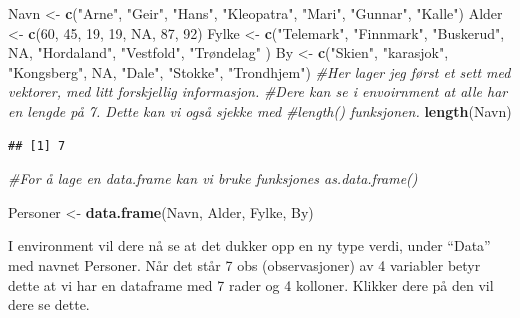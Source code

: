 \documentclass[
]{article}
\newenvironment{Shaded}{\begin{snugshade}}{\end{snugshade}}
\newcommand{\CommentTok}[1]{\textcolor[rgb]{0.56,0.35,0.01}{\textit{#1}}}
\newcommand{\DecValTok}[1]{\textcolor[rgb]{0.00,0.00,0.81}{#1}}
\newcommand{\KeywordTok}[1]{\textcolor[rgb]{0.13,0.29,0.53}{\textbf{#1}}}
\newcommand{\NormalTok}[1]{#1}
\newcommand{\OtherTok}[1]{\textcolor[rgb]{0.56,0.35,0.01}{#1}}
\newcommand{\StringTok}[1]{\textcolor[rgb]{0.31,0.60,0.02}{#1}}
\begin{document}
\begin{Shaded}
\begin{Highlighting}[]
\NormalTok{Navn <-}\StringTok{ }\KeywordTok{c}\NormalTok{(}\StringTok{"Arne"}\NormalTok{, }\StringTok{"Geir"}\NormalTok{, }\StringTok{"Hans"}\NormalTok{, }\StringTok{"Kleopatra"}\NormalTok{, }\StringTok{"Mari"}\NormalTok{, }\StringTok{"Gunnar"}\NormalTok{, }\StringTok{"Kalle"}\NormalTok{)}
\NormalTok{Alder <-}\StringTok{ }\KeywordTok{c}\NormalTok{(}\DecValTok{60}\NormalTok{, }\DecValTok{45}\NormalTok{, }\DecValTok{19}\NormalTok{, }\DecValTok{19}\NormalTok{, }\OtherTok{NA}\NormalTok{, }\DecValTok{87}\NormalTok{, }\DecValTok{92}\NormalTok{)}
\NormalTok{Fylke <-}\StringTok{ }\KeywordTok{c}\NormalTok{(}\StringTok{"Telemark"}\NormalTok{, }\StringTok{"Finnmark"}\NormalTok{, }\StringTok{"Buskerud"}\NormalTok{, }\OtherTok{NA}\NormalTok{, }\StringTok{"Hordaland"}\NormalTok{, }\StringTok{"Vestfold"}\NormalTok{, }\StringTok{"Trøndelag"}\NormalTok{ )}
\NormalTok{By <-}\StringTok{ }\KeywordTok{c}\NormalTok{(}\StringTok{"Skien"}\NormalTok{, }\StringTok{"karasjok"}\NormalTok{, }\StringTok{"Kongsberg"}\NormalTok{, }\OtherTok{NA}\NormalTok{, }\StringTok{"Dale"}\NormalTok{, }\StringTok{"Stokke"}\NormalTok{, }\StringTok{"Trondhjem"}\NormalTok{)}
\CommentTok{#Her lager jeg først et sett med vektorer, med litt forskjellig informasjon.}
\CommentTok{#Dere kan se i envoirnment at alle har en lengde på 7. Dette kan vi også sjekke med}
\CommentTok{#length() funksjonen. }
\KeywordTok{length}\NormalTok{(Navn)}
\end{Highlighting}
\end{Shaded}

\begin{verbatim}
## [1] 7
\end{verbatim}

\begin{Shaded}
\begin{Highlighting}[]
\CommentTok{#For å lage en data.frame kan vi bruke funksjones as.data.frame()}

\NormalTok{Personer <-}\StringTok{ }\KeywordTok{data.frame}\NormalTok{(Navn, Alder, Fylke, By)}
\end{Highlighting}
\end{Shaded}

I environment vil dere nå se at det dukker opp en ny type verdi, under
``Data'' med navnet Personer. Når det står 7 obs (observasjoner) av 4
variabler betyr dette at vi har en dataframe med 7 rader og 4 kolloner.
Klikker dere på den vil dere se dette.
\end{document}
